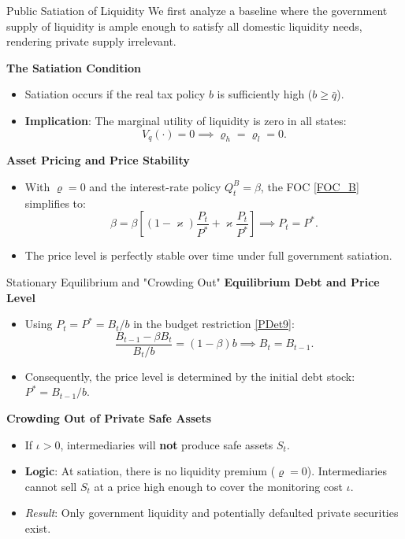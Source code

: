\documentclass[11pt,aspectratio=169]{beamer}
\begin{document}
\begin{frame}{Public Satiation of Liquidity}
\small
We first analyze a baseline where the government supply of liquidity is ample enough to satisfy all domestic liquidity needs, rendering private supply irrelevant.

\vspace{0.2cm}
\textbf{The Satiation Condition}
\begin{itemize}
    \item Satiation occurs if the real tax policy $b$ is sufficiently high ($b \geq \bar{q}$).
    \item \textbf{Implication}: The marginal utility of liquidity is zero in all states:
    \[ V_{q}(\cdot )=0 \implies \varrho _{h}=\varrho _{l}=0. \]
\end{itemize}

\vspace{0.2cm}
\textbf{Asset Pricing and Price Stability}
\begin{itemize}
    \item With $\varrho=0$ and the interest-rate policy $Q_{t}^{B}=\beta$, the FOC \eqref{FOC_B} simplifies to:
    \begin{equation*}
    \beta = \beta \left[ (1-\varkappa)\frac{P_t}{P^*} + \varkappa\frac{P_t}{P^*} \right] \implies P_t = P^*.
    \end{equation*}
    \item The price level is perfectly stable over time under full government satiation.
\end{itemize}
\end{frame}

\begin{frame}{Stationary Equilibrium and "Crowding Out"}
\small
\textbf{Equilibrium Debt and Price Level}
\begin{itemize}
    \item Using $P_{t} = P^{\ast} = B_{t}/b$ in the budget restriction \eqref{PDet9}:
    \[ \frac{B_{t-1} - \beta B_t}{B_t/b} = (1-\beta)b \implies B_t = B_{t-1}. \]
    \item Consequently, the price level is determined by the initial debt stock: $P^{\ast} = B_{t-1}/b$.
\end{itemize}

\vspace{0.3cm}
\textbf{Crowding Out of Private Safe Assets}
\begin{itemize}
    \item If $\iota > 0$, intermediaries will \textbf{not} produce safe assets $S_t$.
    \item \textbf{Logic}: At satiation, there is no liquidity premium ($\varrho = 0$). Intermediaries cannot sell $S_t$ at a price high enough to cover the monitoring cost $\iota$.
    \item \textit{Result}: Only government liquidity and potentially defaulted private securities exist.
\end{itemize}
\end{frame}
\end{document}
